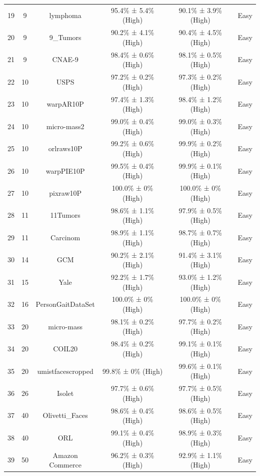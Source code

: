\documentclass[preprint,12pt,authoryear]{elsarticle}
\begin{document}
{\begin{longtable}{|c|c|c|c|c|c|}
19 & 9 & lymphoma & 95.4\% ± 5.4\% (High) & 90.1\% ± 3.9\% (High) & Easy \\
20 & 9 & 9\_Tumors & 90.2\% ± 4.1\% (High) & 90.4\% ± 4.5\% (High) & Easy \\
21 & 9 & CNAE-9 & 98.4\% ± 0.6\% (High) & 98.1\% ± 0.5\% (High) & Easy \\
22 & 10 & USPS & 97.2\% ± 0.2\% (High) & 97.3\% ± 0.2\% (High) & Easy \\
23 & 10 & warpAR10P & 97.4\% ± 1.3\% (High) & 98.4\% ± 1.2\% (High) & Easy \\
24 & 10 & micro-mass2 & 99.0\% ± 0.4\% (High) & 99.0\% ± 0.3\% (High) & Easy \\
25 & 10 & orlraws10P & 99.2\% ± 0.6\% (High) & 99.9\% ± 0.2\% (High) & Easy \\
26 & 10 & warpPIE10P & 99.5\% ± 0.4\% (High) & 99.9\% ± 0.1\% (High) & Easy \\
27 & 10 & pixraw10P & 100.0\% ± 0\% (High) & 100.0\% ± 0\% (High) & Easy \\
28 & 11 & 11Tumors & 98.6\% ± 1.1\% (High) & 97.9\% ± 0.5\% (High) & Easy \\
29 & 11 & Carcinom & 98.9\% ± 1.1\% (High) & 98.7\% ± 0.7\% (High) & Easy \\
30 & 14 & GCM & 90.2\% ± 2.1\% (High) & 91.4\% ± 3.1\% (High) & Easy \\
31 & 15 & Yale & 92.2\% ± 1.7\% (High) & 93.0\% ± 1.2\% (High) & Easy \\
32 & 16 & PersonGaitDataSet & 100.0\% ± 0\% (High) & 100.0\% ± 0\% (High) & Easy \\
33 & 20 & micro-mass & 98.1\% ± 0.2\% (High) & 97.7\% ± 0.2\% (High) & Easy \\
34 & 20 & COIL20 & 98.4\% ± 0.2\% (High) & 99.1\% ± 0.1\% (High) & Easy \\
35 & 20 & umistfacescropped & 99.8\% ± 0\% (High) & 99.6\% ± 0.1\% (High) & Easy \\
36 & 26 & Isolet & 97.7\% ± 0.6\% (High) & 97.7\% ± 0.5\% (High) & Easy \\
37 & 40 & Olivetti\_Faces & 98.6\% ± 0.4\% (High) & 98.6\% ± 0.5\% (High) & Easy \\
38 & 40 & ORL & 99.1\% ± 0.4\% (High) & 98.9\% ± 0.3\% (High) & Easy \\
39 & 50 & Amazon Commerce & 96.2\% ± 0.3\% (High) & 92.9\% ± 1.1\% (High) & Easy 
\arrayrulecolor{black} %
\end{longtable}




}
\end{document}
